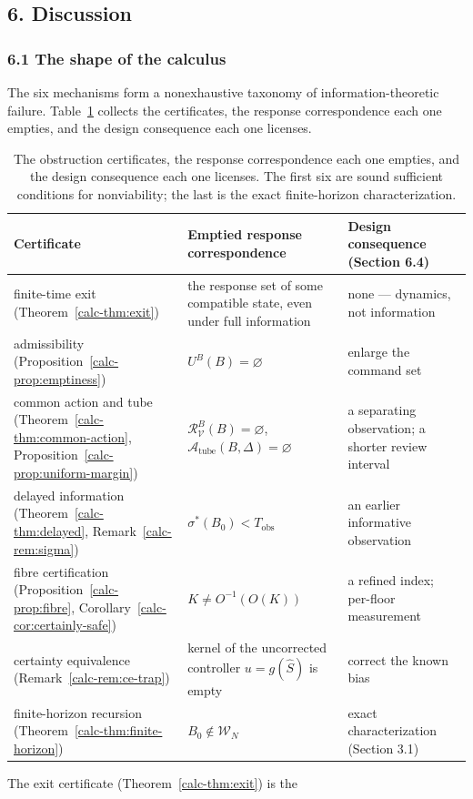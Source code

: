 \documentclass[10pt,twocolumn]{article}
\theoremstyle{definition}
\begin{document}
\subsection{6. Discussion}\label{calc-discussion}


\subsubsection{6.1 The shape of the
calculus}\label{calc-the-shape-of-the-calculus}

The six mechanisms form a nonexhaustive taxonomy of information-theoretic failure. Table~\ref{calc-tab:summary} collects the certificates, the response correspondence each one empties, and the design consequence each one licenses.

\begin{table}[t]
\centering
\footnotesize
\begin{tabular}{@{}l>{\raggedright\arraybackslash}p{3.4cm}>{\raggedright\arraybackslash}p{4.4cm}@{}}
\toprule
Certificate & Emptied response correspondence & Design consequence (Section 6.4) \\
\midrule
finite-time exit (Theorem~\ref{calc-thm:exit}) & the response set of some compatible state, even under full information & none --- dynamics, not information \\
admissibility (Proposition~\ref{calc-prop:emptiness}) & \(U^B(B)=\varnothing\) & enlarge the command set \\
common action and tube (Theorem~\ref{calc-thm:common-action}, Proposition~\ref{calc-prop:uniform-margin}) & \(\mathcal{R}_{\mathcal{V}}^B(B)=\varnothing\), \(\mathcal{A}_{\mathrm{tube}}(B,\Delta)=\varnothing\) & a separating observation; a shorter review interval \\
delayed information (Theorem~\ref{calc-thm:delayed}, Remark~\ref{calc-rem:sigma}) & \(\sigma^*(B_0)<T_{\mathrm{obs}}\) & an earlier informative observation \\
fibre certification (Proposition~\ref{calc-prop:fibre}, Corollary~\ref{calc-cor:certainly-safe}) & \(K\neq O^{-1}(O(K))\) & a refined index; per-floor measurement \\
certainty equivalence (Remark~\ref{calc-rem:ce-trap}) & kernel of the uncorrected controller \(u=g(\hat S)\) is empty & correct the known bias \\
finite-horizon recursion (Theorem~\ref{calc-thm:finite-horizon}) & \(B_0\notin\mathcal{W}_N\) & exact characterization (Section 3.1) \\
\bottomrule
\end{tabular}
\caption{The obstruction certificates, the response correspondence each one empties, and the design consequence each one licenses. The first six are sound sufficient conditions for nonviability; the last is the exact finite-horizon characterization.}
\label{calc-tab:summary}
\end{table} The exit certificate (Theorem~\ref{calc-thm:exit}) is the
\end{document}
